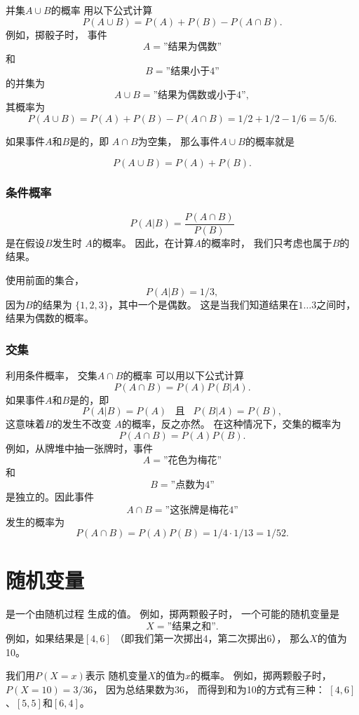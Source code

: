 并集$A \cup B$的概率
用以下公式计算
\[P(A \cup B)=P(A)+P(B)-P(A \cap B).\]
例如，掷骰子时，
事件
\[A=\textrm{''结果为偶数''}\]
和
\[B=\textrm{''结果小于4''}\]
的并集为
\[A \cup B=\textrm{''结果为偶数或小于4''},\]
其概率为
\[P(A \cup B) = P(A)+P(B)-P(A \cap B)=1/2+1/2-1/6=5/6.\]

如果事件$A$和$B$是的，即
$A \cap B$为空集，
那么事件$A \cup B$的概率就是

\[P(A \cup B)=P(A)+P(B).\]

\subsubsection{条件概率}


\[P(A | B) = \frac{P(A \cap B)}{P(B)}\]
是在假设$B$发生时
$A$的概率。
因此，在计算$A$的概率时，
我们只考虑也属于$B$的结果。

使用前面的集合，
\[P(A | B)= 1/3,\]
因为$B$的结果为
$\{1,2,3\}$，其中一个是偶数。
这是当我们知道结果在$1 \ldots 3$之间时，
结果为偶数的概率。

\subsubsection{交集}


利用条件概率，
交集$A \cap B$的概率
可以用以下公式计算
\[P(A \cap B)=P(A)P(B|A).\]
如果事件$A$和$B$是的，即
\[P(A|B)=P(A) \hspace{10pt}\textrm{且}\hspace{10pt} P(B|A)=P(B),\]
这意味着$B$的发生不改变
$A$的概率，反之亦然。
在这种情况下，交集的概率为
\[P(A \cap B)=P(A)P(B).\]
例如，从牌堆中抽一张牌时，事件
\[A = \textrm{''花色为梅花''}\]
和
\[B = \textrm{''点数为4''}\]
是独立的。因此事件
\[A \cap B = \textrm{''这张牌是梅花4''}\]
发生的概率为
\[P(A \cap B)=P(A)P(B)=1/4 \cdot 1/13 = 1/52.\]

\section{随机变量}


是一个由随机过程
生成的值。
例如，掷两颗骰子时，
一个可能的随机变量是
\[X=\textrm{''结果之和''}.\]
例如，如果结果是$[4,6]$
（即我们第一次掷出4，第二次掷出6），
那么$X$的值为10。

我们用$P(X=x)$表示
随机变量$X$的值为$x$的概率。
例如，掷两颗骰子时，
$P(X=10)=3/36$，
因为总结果数为36，
而得到和为10的方式有三种：
$[4,6]$、$[5,5]$和$[6,4]$。

